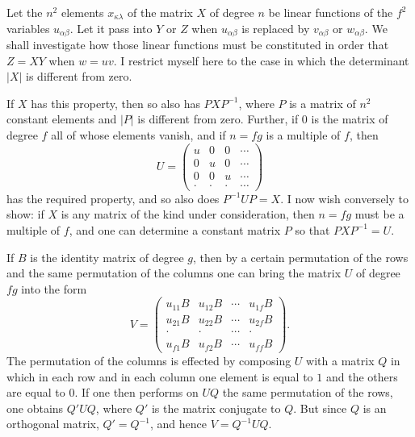 \documentclass[11pt]{article}
\begin{document}
Let the $n^2$ elements $x_{\kappa\lambda}$ of the matrix $X$ of degree $n$ be linear functions of the $f^2$ variables $u_{\alpha\beta}$. Let it pass into $Y$ or $Z$ when $u_{\alpha\beta}$ is replaced by $v_{\alpha\beta}$ or $w_{\alpha\beta}$. We shall investigate how those linear functions must be constituted in order that $Z=XY$ when $w=uv$. I restrict myself here to the case in which the determinant $|X|$ is different from zero.

If $X$ has this property, then so also has $PXP^{-1}$, where $P$ is a matrix of $n^2$ constant elements and $|P|$ is different from zero. Further, if $0$ is the matrix of degree $f$ all of whose elements vanish, and if $n=fg$ is a multiple of $f$, then
\[
U=\begin{pmatrix}
u&0&0&\cdots\\
0&u&0&\cdots\\
0&0&u&\cdots\\
\cdot&\cdot&\cdot&\cdots
\end{pmatrix}
\]
has the required property, and so also does $P^{-1}UP=X$. I now wish conversely to show: if $X$ is any matrix of the kind under consideration, then $n=fg$ must be a multiple of $f$, and one can determine a constant matrix $P$ so that $PXP^{-1}=U$.

If $B$ is the identity matrix of degree $g$, then by a certain permutation of the rows and the same permutation of the columns one can bring the matrix $U$ of degree $fg$ into the form
\[
V=\begin{pmatrix}
u_{11}B&u_{12}B&\cdots&u_{1f}B\\
u_{21}B&u_{22}B&\cdots&u_{2f}B\\
\cdot&\cdot&\cdots&\cdot\\
u_{f1}B&u_{f2}B&\cdots&u_{ff}B
\end{pmatrix}.
\]
The permutation of the columns is effected by composing $U$ with a matrix $Q$ in which in each row and in each column one element is equal to $1$ and the others are equal to $0$. If one then performs on $UQ$ the same permutation of the rows, one obtains $Q'UQ$, where $Q'$ is the matrix conjugate to $Q$. But since $Q$ is an orthogonal matrix, $Q'=Q^{-1}$, and hence $V=Q^{-1}UQ$.
\end{document}
